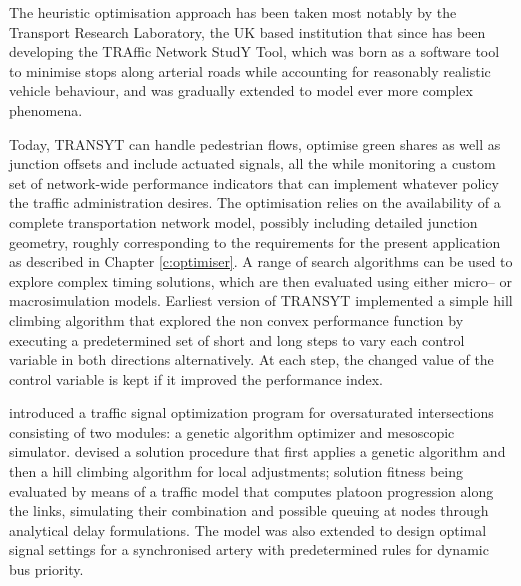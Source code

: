 The heuristic optimisation approach has been taken most notably by the Transport Research Laboratory, the UK based institution that since \citep{robertson1969transyt} has been developing the TRAffic Network StudY Tool, which was born as a software tool to minimise stops along arterial roads while accounting for reasonably realistic vehicle behaviour, and was gradually extended to model ever more complex phenomena. 

Today, TRANSYT can handle pedestrian flows, optimise green shares as well as junction offsets and include actuated signals, all the while monitoring a custom set of network-wide performance indicators that can implement whatever policy the traffic administration desires. The optimisation relies on the availability of a complete transportation network model, possibly including detailed junction geometry, roughly corresponding to the requirements for the present application as described in Chapter \ref{c:optimiser}.
A range of search algorithms can be used to explore complex timing solutions, which are then evaluated using either micro– or macrosimulation models.
Earliest version of TRANSYT implemented a simple hill climbing algorithm that explored the non convex performance function by executing a predetermined set of short and long steps to vary each control variable in both directions alternatively. At each step, the changed value of the control variable is kept if it improved the performance index. 

\cite{park1999traffic} introduced a traffic signal optimization program for oversaturated intersections consisting of two modules: a genetic algorithm optimizer and mesoscopic simulator. \cite{colombaroni2009optimization} devised a solution procedure that first applies a genetic algorithm and then a hill climbing algorithm for local adjustments; solution fitness being evaluated by means of a traffic model that computes platoon progression along the links, simulating their combination and possible queuing at nodes through analytical delay formulations. The model was also extended to design optimal signal settings for a synchronised artery with predetermined rules for dynamic bus priority.

